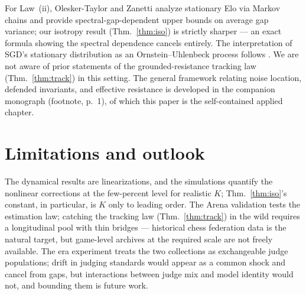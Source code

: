 \documentclass[11pt]{article}
\begin{document}
For Law~(ii), Olesker-Taylor and Zanetti \cite{olesker2024} analyze
stationary Elo via Markov chains and provide spectral-gap-dependent
upper bounds on average gap variance; our isotropy result
(Thm.~\ref{thm:iso}) is strictly sharper --- an exact formula showing
the spectral dependence cancels entirely. The interpretation of SGD's
stationary distribution as an Ornstein--Uhlenbeck process follows
\cite{mandt2017}. We are not aware of prior statements of the
grounded-resistance tracking law (Thm.~\ref{thm:track}) in this
setting. The general framework relating noise location, defended
invariants, and effective resistance is developed in the companion
monograph (footnote, p.~1), of which this paper is the self-contained
applied chapter.

\section{Limitations and outlook}

The dynamical results are linearizations, and the simulations quantify
the nonlinear corrections at the few-percent level for realistic $K$;
Thm.~\ref{thm:iso}'s constant, in particular, is $K$ only to leading
order. The Arena validation tests the estimation law; catching the
tracking law (Thm.~\ref{thm:track}) in the wild requires a longitudinal
pool with thin bridges --- historical chess federation data is the
natural target, but game-level archives at the required scale are not
freely available. The era experiment treats the two collections as
exchangeable judge populations; drift in judging standards would appear
as a common shock and cancel from gaps, but interactions between judge
mix and model identity would not, and bounding them is future work.
\end{document}
